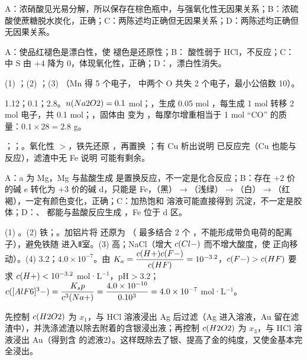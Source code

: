 \begin{jiexilist}
\item {}A：浓硝酸见光易分解，所以保存在棕色瓶中，与强氧化性无因果关系；B：浓硫酸使蔗糖脱水炭化，正确；C：两陈述均正确但无因果关系；D：两陈述均正确但无因果关系。
\item {}A：使品红褪色是漂白性，使  褪色是还原性；B： 酸性弱于 HCl，不反应；C： 中 S 由 $+4$ 降为 0，体现氧化性，正确；D：，漂白性消失。
\item (1) ；(2) ；(3) （Mn 得 5 个电子， 中两个 O 共失 2 个电子，最小公倍数 10）。
\item 1.12；0.1；2.8。$n(Na2O2)=0.1$ mol；，生成 0.05 mol ，每生成 1 mol  转移 2 mol 电子，共 0.1 mol；，固体由  变为 ，每摩尔增重相当于 1 mol “CO” 的质量：$0.1\times28=2.8$ g。
\item {}；；。氧化性 $>$，铁先还原 ，再置换 ；有 Cu 析出说明  已反应完（Cu 也能与  反应），滤渣中无 Fe 说明  可能有剩余。
\item {}A：a 为 Mg，Mg 与盐酸生成  是置换反应，不一定是化合反应；B：存在 $+2$ 价的碱 e 转化为 $+3$ 价的碱 d，只能是 Fe，（黑）$\to$（浅绿）$\to$（白）$\to$（红褐），一定有颜色变化，正确；C：加热饱和  溶液可能直接得到  沉淀，不一定是胶体；D：、 都能与盐酸反应生成 ，Fe 位于 d 区。
\item (1) 。(2) 铁；\ce{[FeCl4]-}。加铝片将  还原为 （ 最多结合 2 个 ，不能形成带负电荷的配离子），避免铁随 \ce{[FeCl4]-} 进入Ⅱ室。(3) 高；NaCl（增大 $c(Cl-)$ 而不增大酸度，使  正向移动）。(4) 3.2；$4.0\times10^{-7}$。由 $K_a=\dfrac{c(H+)c(F-)}{c(HF)}=10^{-3.2}$，$c(F-)>c(HF)$ 要求 $c(H+)<10^{-3.2}$ mol·L$^{-1}$，pH$>3.2$；$c([AlF6]^3-)=\dfrac{K_sp}{c^3(Na+)}=\dfrac{4.0\times10^{-10}}{0.10^3}=4.0\times10^{-7}$ mol·L$^{-1}$。
\item 先控制 $c(H2O2)$ 为 $x_1$，与 HCl 溶液浸出 Ag 后过滤（Ag 进入溶液，Au 留在滤渣中），并洗涤滤渣以除去附着的含银浸出液；再控制 $c(H2O2)$ 为 $x_3$，与 HCl 溶液浸出 Au（得到含 \ce{[AuCl4]-} 的滤液2）。这样既除去了银、提高了金的纯度，又使金基本完全浸出。

\end{jiexilist}
